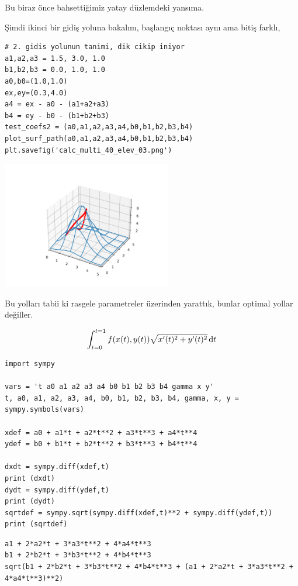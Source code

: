 \documentclass[12pt,fleqn]{article}\usepackage{../../common}
\begin{document}
Bu biraz önce bahsettiğimiz yatay düzlemdeki yansıma.

Şimdi ikinci bir gidiş yoluna bakalım, başlangıç noktası aynı ama bitiş farklı,

\begin{verbatim}
# 2. gidis yolunun tanimi, dik cikip iniyor
a1,a2,a3 = 1.5, 3.0, 1.0
b1,b2,b3 = 0.0, 1.0, 1.0
a0,b0=(1.0,1.0)
ex,ey=(0.3,4.0)
a4 = ex - a0 - (a1+a2+a3)
b4 = ey - b0 - (b1+b2+b3)
test_coefs2 = (a0,a1,a2,a3,a4,b0,b1,b2,b3,b4)
plot_surf_path(a0,a1,a2,a3,a4,b0,b1,b2,b3,b4)
plt.savefig('calc_multi_40_elev_03.png')
\end{verbatim}

\includegraphics[width=20em]{calc_multi_40_elev_03.png}

Bu yolları tabii ki rasgele parametreler üzerinden yarattık, bunlar optimal
yollar değiller.

$$
\int_{t=0}^{t=1} f(x(t),y(t)) \sqrt {x'(t)^2 + y'(t)^2} \,\mathrm{d} t
$$


\begin{verbatim}
import sympy

vars = 't a0 a1 a2 a3 a4 b0 b1 b2 b3 b4 gamma x y'
t, a0, a1, a2, a3, a4, b0, b1, b2, b3, b4, gamma, x, y = sympy.symbols(vars)

xdef = a0 + a1*t + a2*t**2 + a3*t**3 + a4*t**4
ydef = b0 + b1*t + b2*t**2 + b3*t**3 + b4*t**4

dxdt = sympy.diff(xdef,t)
print (dxdt)
dydt = sympy.diff(ydef,t)
print (dydt)
sqrtdef = sympy.sqrt(sympy.diff(xdef,t)**2 + sympy.diff(ydef,t))
print (sqrtdef)
\end{verbatim}

\begin{verbatim}
a1 + 2*a2*t + 3*a3*t**2 + 4*a4*t**3
b1 + 2*b2*t + 3*b3*t**2 + 4*b4*t**3
sqrt(b1 + 2*b2*t + 3*b3*t**2 + 4*b4*t**3 + (a1 + 2*a2*t + 3*a3*t**2 + 4*a4*t**3)**2)
\end{verbatim}
\end{document}
